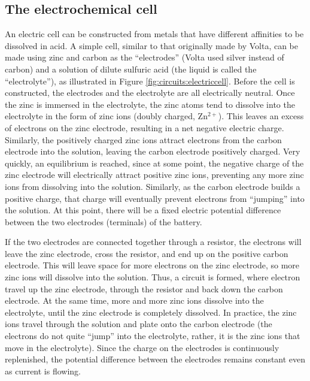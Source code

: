 \subsection{The electrochemical cell}
An electric cell can be constructed from metals that have different affinities to be dissolved in acid. A simple cell, similar to that originally made by Volta, can be made using zinc and carbon as the ``electrodes'' (Volta used silver instead of carbon) and a solution of dilute sulfuric acid (the liquid is called the ``electrolyte''), as illustrated in Figure \ref{fig:circuits:electriccell}. Before the cell is constructed, the electrodes and the electrolyte are all electrically neutral.
Once the zinc is immersed in the electrolyte, the zinc atoms tend to dissolve into the electrolyte in the form of zinc ions (doubly charged, Zn$^{2+}$). This leaves an excess of electrons on the zinc electrode, resulting in a net negative electric charge. Similarly, the positively charged zinc ions attract electrons from the carbon electrode into the solution, leaving the carbon electrode positively charged. Very quickly, an equilibrium is reached, since at some point, the negative charge of the zinc electrode will electrically attract positive zinc ions, preventing any more zinc ions from dissolving into the solution. Similarly, as the carbon electrode builds a positive charge, that charge will eventually prevent electrons from ``jumping'' into the solution. At this point, there will be a fixed electric potential difference between the two electrodes (terminals) of the battery. 

If the two electrodes are connected together through a resistor, the electrons will leave the zinc electrode, cross the resistor, and end up on the positive carbon electrode. This will leave space for more electrons on the zinc electrode, so more zinc ions will dissolve into the solution. Thus, a circuit is formed, where electron travel up the zinc electrode, through the resistor and back down the carbon electrode. At the same time, more and more zinc ions dissolve into the electrolyte, until the zinc electrode is completely dissolved. In practice, the zinc ions travel through the solution and plate onto the carbon electrode (the electrons do not quite ``jump'' into the electrolyte, rather, it is the zinc ions that move in the electrolyte). Since the charge on the electrodes is continuously replenished, the potential difference between the electrodes remains constant even as current is flowing.


